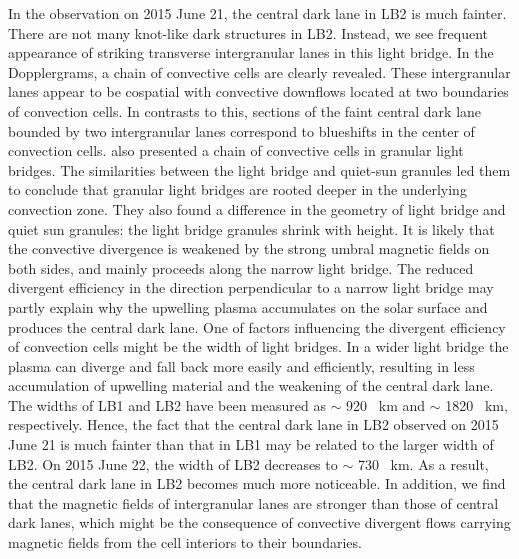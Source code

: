 \documentclass[preprint2]{aastex}
\begin{document}
In the observation on 2015 June 21, the central dark lane in LB2 is much fainter. There are not many knot-like dark structures in LB2. Instead, we see frequent appearance of striking transverse intergranular lanes in this light bridge. In the Dopplergrams, a chain of convective cells are clearly revealed. These intergranular lanes appear to be cospatial with convective downflows located at two boundaries of convection cells. In contrasts to this, sections of the faint central dark lane bounded by two intergranular lanes correspond to blueshifts in the center of convection cells. \cite{Lagg2014} also presented a chain of convective cells in granular light bridges. The similarities between the light bridge and quiet-sun granules led them to conclude that granular light bridges are rooted deeper in the underlying convection zone. They also found a difference in the geometry of light bridge and quiet sun granules: the light bridge granules shrink with height. It is likely that the convective divergence is weakened by the strong umbral magnetic fields on both sides, and mainly proceeds along the narrow light bridge. The reduced divergent efficiency in the direction perpendicular to a narrow light bridge may partly explain why the upwelling plasma accumulates on the solar surface and produces the central dark lane. One of factors influencing the divergent efficiency of convection cells might be the width of light bridges. In a wider light bridge the plasma can diverge and fall back more easily and efficiently, resulting in less accumulation of upwelling material and the weakening of the central dark lane. The widths of LB1 and LB2 have been measured as $\sim$ 920 ~km and $\sim$ 1820 ~km, respectively. Hence, the fact that the central dark lane in LB2 observed on 2015 June 21 is much fainter than that in LB1 may be related to the larger width of LB2. On 2015 June 22, the width of LB2 decreases to $\sim$ 730 ~km. As a result, the central dark lane in LB2 becomes much more noticeable. In addition, we find that the magnetic fields of intergranular lanes are stronger than those of central dark lanes, which might be the consequence of convective divergent flows carrying magnetic fields from the cell interiors to their boundaries.
\end{document}
